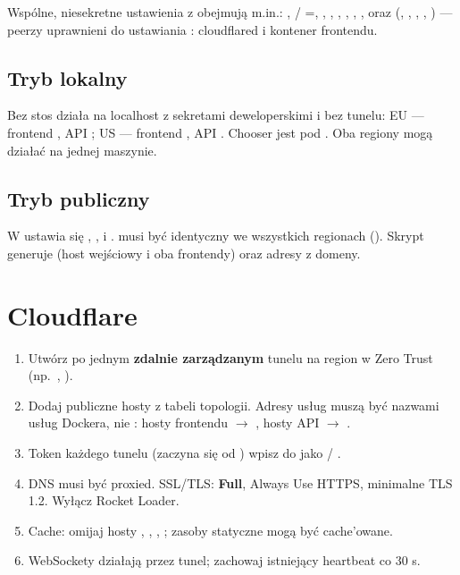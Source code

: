 Wspólne, niesekretne ustawienia z  obejmują m.in.:
, /
=, , ,
, ,
, ,
 oraz 
(, , , , ) ---
peerzy uprawnieni do ustawiania : cloudflared i kontener frontendu.

\subsection{Tryb lokalny}

Bez  stos działa na localhost z sekretami deweloperskimi i bez
tunelu: EU --- frontend , API ;
US --- frontend , API . Chooser
jest pod . Oba regiony mogą działać na jednej maszynie.

\subsection{Tryb publiczny}

W  ustawia się , ,
 i .  musi być identyczny we
wszystkich regionach (). Skrypt generuje 
(host wejściowy i oba frontendy) oraz adresy  z domeny.

\section{Cloudflare}
\label{sec:op-cloudflare}

\begin{enumerate}
  \item Utwórz po jednym \textbf{zdalnie zarządzanym} tunelu na region w Zero Trust (np.\ , ).
  \item Dodaj publiczne hosty z tabeli topologii. Adresy usług muszą być nazwami usług Dockera, nie : hosty frontendu $\rightarrow$ , hosty API $\rightarrow$ .
  \item Token każdego tunelu (zaczyna się od ) wpisz do  jako  / .
  \item DNS musi być proxied. SSL/TLS: \textbf{Full}, Always Use HTTPS, minimalne TLS 1.2. Wyłącz Rocket Loader.
  \item Cache: omijaj hosty , , , ; zasoby statyczne mogą być cache'owane.
  \item WebSockety działają przez tunel; zachowaj istniejący heartbeat co 30 s.
\end{enumerate}

